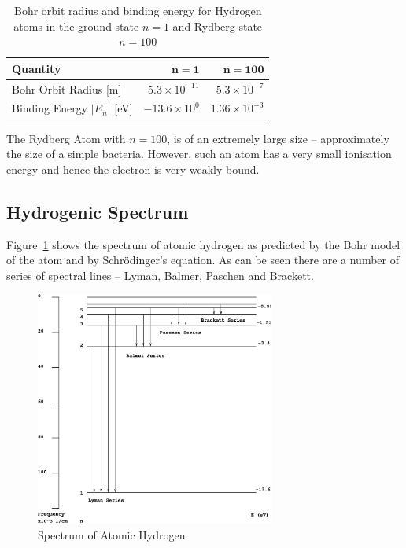 \documentclass[a4paper]{IEEEtran}
\begin{document}
    \begin{table} 
        \caption{Bohr orbit radius and binding energy for Hydrogen atoms in 
                 the ground state $n=1$ and Rydberg state $n=100$} 
        \label{tbl:rydberg} 
        \centering
        \begin{tabular}{p{4cm}rr} \hline
            {\bf Quantity}               & $\mathbf{n = 1}$          & $\mathbf{n = 100}$ \\ \hline \hline 
            Bohr Orbit Radius [m]        &  $5.3 \times 10^{-11}$    & $5.3 \times 10^{-7}$ \\ 
            Binding Energy $|E_n|$ [eV]  &  $-13.6 \times 10^0$      & $1.36 \times 10^{-3}$ \\ \hline
        \end{tabular}
    \end{table} 

    The Rydberg Atom with $n = 100$, is of an extremely large size -- approximately the size
    of a simple bacteria. However, such an atom has a very small ionisation energy and hence
    the electron is very weakly bound.

    \subsection{Hydrogenic Spectrum}
    Figure~\ref{fig:spectrum} shows the spectrum of atomic hydrogen as predicted by the
    Bohr model of the atom and by Schr\"odinger's equation. As can be seen there
    are a number of series of spectral lines -- Lyman, Balmer, Paschen and Brackett.

    \begin{figure}[!t]
        \centering
        \includegraphics[width=0.7\textwidth]{spectrum}
        \caption{Spectrum of Atomic Hydrogen} 
        \label{fig:spectrum} 
    \end{figure} 
\end{document}
